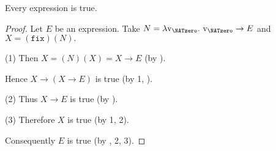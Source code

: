 \documentclass[english]{article}
\newcommand{\var}[1]{\textrm{v}_{#1}}
\newcommand{\abs}[2]{\lambda\var{#1}.\ #2}
\newcommand{\app}[2]{(#1)(#2)}
\newcommand{\fix}{\texttt{fix}}
\begin{document}
  \begin{forthel}
    \begin{theorem*}[title=Curry's paradox,id=curry_paradox]
      Every expression is true.
    \end{theorem*}
    \begin{proof}
      Let $E$ be an expression.
      Take $N = \abs{\NATzero}{\var{\NATzero} \rightarrow E}$ and $X = \app{\fix}{N}.$
  
      (1) Then $X = \app{N}{X} = X \rightarrow E$ (by ).
  
      Hence $X \rightarrow (X \rightarrow E)$ is true (by 1, ).
  
      (2) Thus $X \rightarrow E$ is true (by ).
  
      (3) Therefore $X$ is true (by 1, 2).
  
      Consequently $E$ is true (by , 2, 3).
    \end{proof}
  \end{forthel}

  \printbibliography
\end{document}
